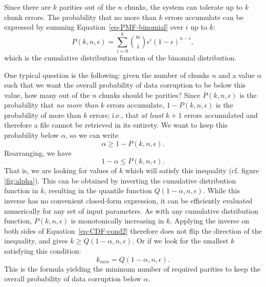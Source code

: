 \documentclass[manuscript,screen,review]{acmart}
\begin{document}
Since there are $k$ parities out of the $n$ chunks, the system can tolerate up to $k$ chunk errors. The probability that no more than $k$ errors accumulate can be expressed by summing Equation~\ref{eq-PMF-binomial} over $i$ up to $k$:
\begin{equation}
  P(k, n, \epsilon) = \sum_{i=0}^k \binom{n}{i} \epsilon^i (1-\epsilon)^{n-i} ,
  \label{eq-CDF-binomial}
\end{equation}
which is the cumulative distribution function of the binomial distribution.

One typical question is the following: given the number of chunks $n$ and a value $\alpha$ such that we want the overall probability of data corruption to be below this value, how many out of the $n$ chunks should be parities? Since $P(k, n, \epsilon)$ is the probability that \emph{no more than} $k$ errors accumulate, $1 - P(k, n, \epsilon)$ is the probability of more than $k$ errors; i.e., that \emph{at least} $k + 1$ errors accumulated and therefore a file cannot be retrieved in its entirety. We want to keep this probability below $\alpha$, so we can write
\begin{equation}
  \alpha \ge 1 - P(k, n, \epsilon) .
  \label{eq-CDF-cond}
\end{equation}
Rearranging, we have
\begin{equation}
  1 - \alpha \le P(k, n, \epsilon) .
  \label{eq-CDF-cond2}
\end{equation}
That is, we are looking for values of $k$ which will satisfy this inequality (cf. figure \ref{fig:alpha}). This can be obtained by inverting the cumulative distribution function in $k$, resulting in the quantile function $Q(1 - \alpha, n, \epsilon)$. While this inverse has no convenient closed-form expression, it can be efficiently evaluated numerically for any set of input parameters. As with any cumulative distribution function, $P(k, n, \epsilon)$ is monotonically increasing in $k$. Applying the inverse on both sides of Equation~\ref{eq-CDF-cond2} therefore does not flip the direction of the inequality, and gives $k \ge Q(1 - \alpha, n, \epsilon)$. Or if we look for the smallest $k$ satisfying this condition:
\begin{equation}
  k_{\mathit{min}} = Q(1 - \alpha, n, \epsilon) .
  \label{eq-quantile-sol-n}
\end{equation}
This is the formula yielding the minimum number of required parities to keep the overall probability of data corruption below $\alpha$.
\end{document}
